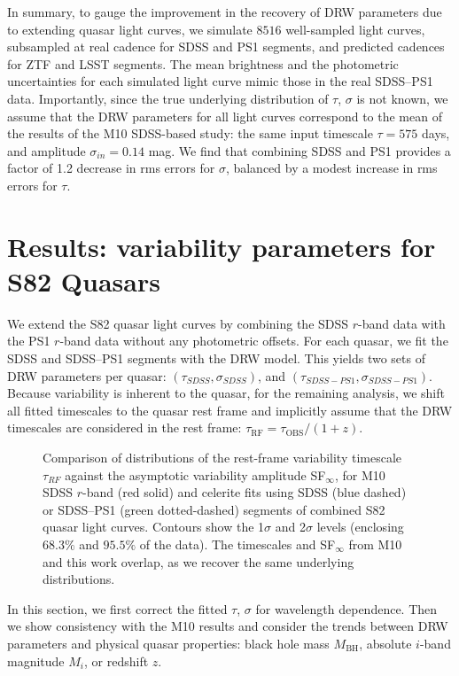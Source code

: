 \documentclass[twocolumn]{aastex62}
\newcommand{\project}[1]{\textsf{#1}}
\begin{document}
In summary, to gauge the improvement in the recovery of DRW parameters due to extending quasar light curves, we simulate $8516$ well-sampled light curves, subsampled at real cadence for SDSS and PS1 segments, and predicted cadences for ZTF and LSST segments. The mean brightness and the photometric uncertainties for each simulated light curve  mimic those in the real SDSS--PS1 data. Importantly, since the true underlying distribution of $\tau$, $\sigma$ is not known, we assume that the DRW parameters for all light curves correspond to the mean of the results of the M10 SDSS-based study: the same input timescale $\tau=575$ days, and amplitude $\sigma_{in}=0.14$ mag.  We find that combining SDSS and PS1 provides a factor of 1.2 decrease in rms errors for $\sigma$, balanced by a modest increase in rms errors for $\tau$.
%
%
%
%
%
%

\section{Results: variability parameters for S82 Quasars}\label{sec:results}

We extend the S82 quasar light curves by combining the SDSS $r$-band data with  the PS1 $r$-band data without any photometric offsets. For each quasar, we fit the SDSS and SDSS--PS1 segments  with the DRW model. This yields two sets of DRW parameters per quasar: $(\tau_{SDSS}, \sigma_{SDSS})$, and $(\tau_{SDSS-PS1},\sigma_{SDSS-PS1})$. Because variability is inherent to the quasar, for the remaining analysis, we shift all fitted timescales to the quasar rest frame and implicitly assume that the DRW timescales are considered in the rest frame: $\tau_{\mathrm{RF}} = \tau_{\mathrm{OBS}} / (1+z)$.

\begin{figure} 
	\caption{Comparison of distributions of the rest-frame variability timescale $\tau_{RF}$ against the  asymptotic variability amplitude SF$_{\infty}$, for M10 SDSS $r$-band (red solid)  and \project{celerite} fits using  SDSS (blue dashed) or SDSS--PS1 (green dotted-dashed) segments of combined S82 quasar light curves. Contours show the 1$\sigma$ and 2$\sigma$ levels (enclosing $68.3\%$ and $95.5\%$ of the data). The timescales and SF$_{\infty}$ from M10 and this work overlap, as we recover the same underlying distributions. }
	\label{fig:tau_sf_dist}
\end{figure} 


In this section, we first correct the fitted $\tau$, $\sigma$ for wavelength dependence. Then we show consistency with the M10 results and consider the trends between DRW parameters and physical quasar properties: black hole mass $M_{\mathrm{BH}}$, absolute $i$-band  magnitude $M_{i}$, or redshift $z$.  
\end{document}
